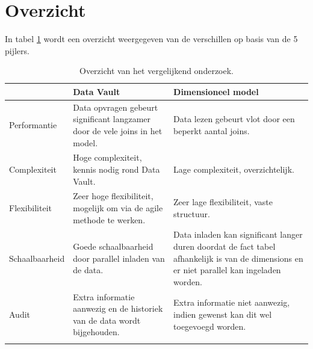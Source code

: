 \newpage
\section{Overzicht}
In tabel \ref{tab:overzicht} wordt een overzicht weergegeven van de verschillen op basis van de 5 pijlers.
\begin{center}
	\renewcommand{\arraystretch}{2}%
	\begin{longtable}{  l  p{}  p{} }
		\ & \textbf{Data Vault} & \textbf{Dimensioneel model} \\ \hline
		Performantie & Data opvragen gebeurt significant langzamer door de vele joins in het model. & Data lezen gebeurt vlot door een beperkt aantal joins. \\ \hline
		Complexiteit & Hoge complexiteit, kennis nodig rond Data Vault. & Lage complexiteit, overzichtelijk. \\ \hline
		Flexibiliteit & Zeer hoge flexibiliteit, mogelijk om via de agile methode te werken. & Zeer lage flexibiliteit, vaste structuur. \\ \hline
		Schaalbaarheid & Goede schaalbaarheid door parallel inladen van de data. & Data inladen kan significant langer duren doordat de fact tabel afhankelijk is van de dimensions en er niet parallel kan ingeladen worden.  \\ \hline
		Audit & Extra informatie aanwezig en de historiek van de data wordt bijgehouden. & Extra informatie niet aanwezig, indien gewenst kan dit wel toegevoegd worden. \\
		\caption{Overzicht van het vergelijkend onderzoek.}
		\label{tab:overzicht}
	\end{longtable}
\end{center}